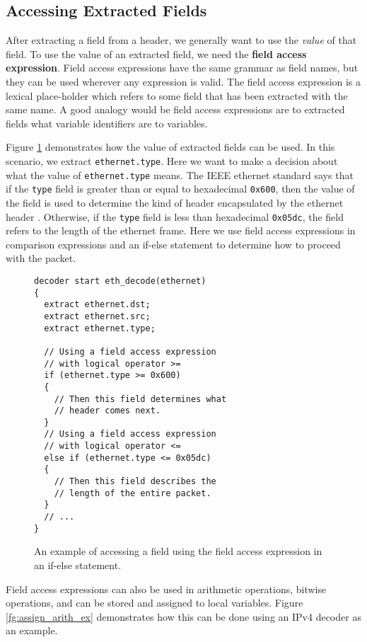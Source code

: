 \subsection{Accessing Extracted Fields} \label{decoder_access_tut}

After extracting a field from a header, we generally want to use the \textit{value} of that field. To use the value of an extracted field, we need the \textbf{field access expression}. Field access expressions have the same grammar as field names, but they can be used wherever any expression is valid.  The field access expression is a lexical place-holder which refers to some field that has been extracted with the same name. A good analogy would be field access expressions are to extracted fields what variable identifiers are to variables.

Figure \ref{fg:access_ex} demonstrates how the value of extracted fields can be used. In this scenario, we extract \texttt{ethernet.type}. Here we want to make a decision about what the value of \texttt{ethernet.type} means. The IEEE ethernet standard says that if the \texttt{type} field is greater than or equal to hexadecimal \texttt{0x600}, then the value of the field is used to determine the kind of header encapsulated by the ethernet header \cite{eth_std}. Otherwise, if the \texttt{type} field is less than hexadecimal \texttt{0x05dc}, the field refers to the length of the ethernet frame. Here we use field access expressions in comparison expressions and an if-else statement to determine how to proceed with the packet. 

\begin{figure}[ht]
\begin{lstlisting}
decoder start eth_decode(ethernet)
{
  extract ethernet.dst;
  extract ethernet.src;
  extract ethernet.type;
  
  // Using a field access expression 
  // with logical operator >=
  if (ethernet.type >= 0x600)
  {
    // Then this field determines what
    // header comes next.
  }
  // Using a field access expression 
  // with logical operator <=
  else if (ethernet.type <= 0x05dc)
  {
    // Then this field describes the
    // length of the entire packet.
  }
  // ...
}
\end{lstlisting}
\caption{An example of accessing a field using the field access expression in an if-else statement.}
\label{fg:access_ex}
\end{figure}

Field access expressions can also be used in arithmetic operations, bitwise operations, and can be stored and assigned to local variables. Figure \ref{fg:assign_arith_ex} demonstrates how this can be done using an IPv4 decoder as an example.

